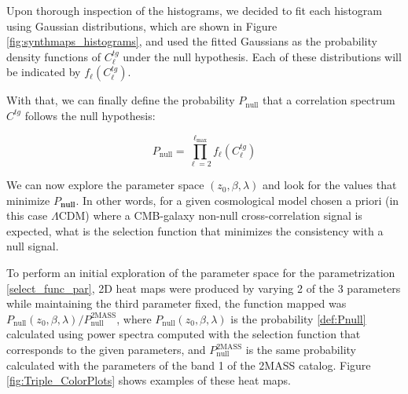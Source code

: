 \documentclass[openany,a4paper,12pt,oneside]{book}
\begin{document}
\begin{spacing}{1.5}
Upon thorough inspection of the histograms, we decided to fit each histogram using Gaussian distributions, which are shown in Figure \ref{fig:synthmaps_histograms}, and used the fitted Gaussians as the probability density functions of $C^{tg}_{\ell}$ under the null hypothesis. Each of these distributions will be indicated by $f_\ell\left(C^{tg}_\ell\right)$.

With that, we can finally define the probability $P_\text{null}$ that a correlation spectrum $C^{tg}$ follows the null hypothesis:

\begin{equation}\label{def:Pnull}
	P_\text{null}=\prod_{\ell=2}^{\ell_\text{max}} f_\ell\left(C^{tg}_\ell\right)
\end{equation}

We can now explore the parameter space $(z_0,\beta,\lambda)$ and look for the values that minimize $P_\textbf{null}$. In other words, for a given cosmological model chosen a priori (in this case $\Lambda$CDM) where a CMB-galaxy non-null cross-correlation signal is expected, what is the selection function that minimizes the consistency with a null signal.

To perform an initial exploration of the parameter space for the parametrization \eqref{select_func_par}, 2D heat maps were produced by varying 2 of the 3 parameters while maintaining the third parameter fixed, the function mapped was $P_\text{null}(z_0, \beta,\lambda)/P_\text{null}^\text{2MASS}$, where $P_\text{null}(z_0, \beta,\lambda)$ is the probability \eqref{def:Pnull} calculated using power spectra computed with the selection function that corresponds to the given parameters, and $P_\text{null}^\text{2MASS}$ is the same probability calculated with the parameters of the band 1 of the 2MASS catalog. Figure \ref{fig:Triple_ColorPlots} shows examples of these heat maps.


\end{spacing}
\end{document}
